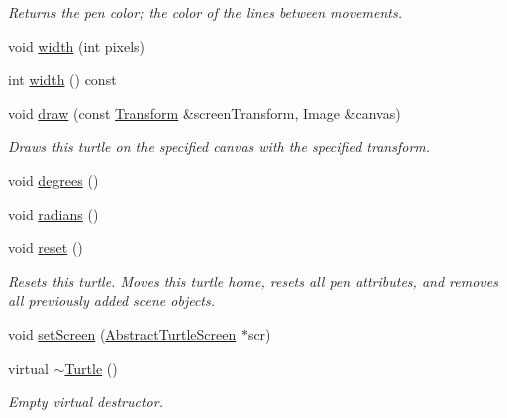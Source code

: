 \begin{DoxyCompactItemize}
\begin{DoxyCompactList}\small\item\em Returns the pen color; the color of the lines between movements. \end{DoxyCompactList}\item 
void \hyperlink{classcturtle_1_1Turtle_a1b5378167a4425fa721552bab0402afc}{width} (int pixels)
\item 
int \hyperlink{classcturtle_1_1Turtle_af45bb9721decb8f091622863d337e9af}{width} () const
\item 
void \hyperlink{classcturtle_1_1Turtle_aac46b43327830632ac8e505e9d9f3d5f}{draw} (const \hyperlink{classcturtle_1_1Transform}{Transform} \&screen\+Transform, Image \&canvas)
\begin{DoxyCompactList}\small\item\em Draws this turtle on the specified canvas with the specified transform. \end{DoxyCompactList}\item 
void \hyperlink{classcturtle_1_1Turtle_aa68704b24017c6a8cda41ff292ecafde}{degrees} ()
\item 
void \hyperlink{classcturtle_1_1Turtle_a9c266e318f05dc5d45ddbeb830a373fa}{radians} ()
\item 
\mbox{\label{classcturtle_1_1Turtle_abdaaa776015722955a9193bebaaca4b3}} 
void \hyperlink{classcturtle_1_1Turtle_abdaaa776015722955a9193bebaaca4b3}{reset} ()
\begin{DoxyCompactList}\small\item\em Resets this turtle. Moves this turtle home, resets all pen attributes, and removes all previously added scene objects. \end{DoxyCompactList}\item 
void \hyperlink{classcturtle_1_1Turtle_a0f47c7d9a17258780d4d0134daf78522}{set\+Screen} (\hyperlink{classcturtle_1_1AbstractTurtleScreen}{Abstract\+Turtle\+Screen} $\ast$scr)
\item 
\mbox{\label{classcturtle_1_1Turtle_a7224baf1faed4dd203e09522507b9d3b}} 
virtual \hyperlink{classcturtle_1_1Turtle_a7224baf1faed4dd203e09522507b9d3b}{$\sim$\+Turtle} ()
\begin{DoxyCompactList}\small\item\em Empty virtual destructor. \end{DoxyCompactList}\end{DoxyCompactItemize}
